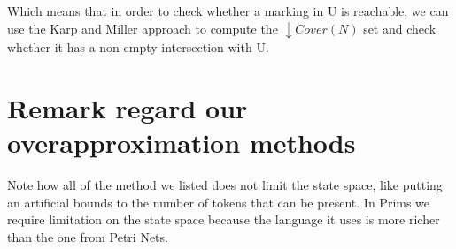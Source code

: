 Which means that in order to check whether a marking in U is reachable, we can use the Karp and Miller approach to compute the $\downarrow Cover(N)$ set and check whether it has a non-empty intersection with U.

\section{Remark regard our overapproximation methods}
Note how all of the method we listed does not limit the state space, like putting an artificial bounds to the number of tokens that can be present. In Prims we require limitation on the state space because the language it uses is more richer than the one from Petri Nets.